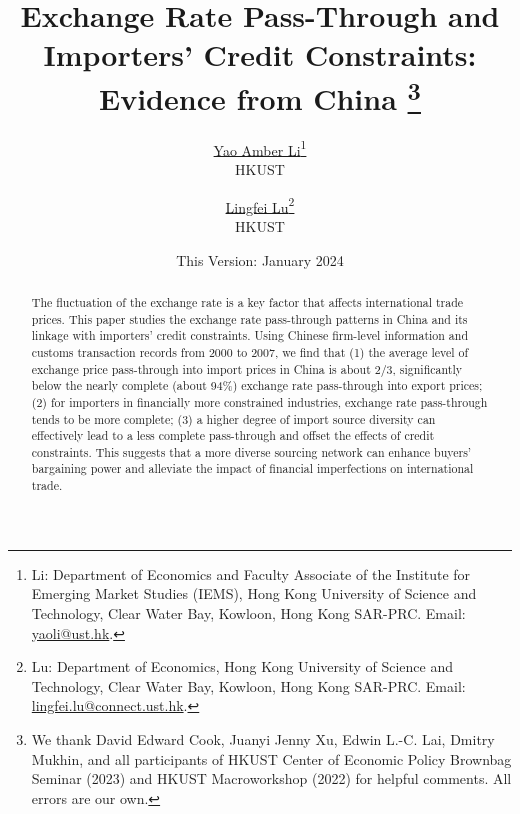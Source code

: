 

\linespread{1.2}
\geometry{a4paper,scale=0.75}



\title{  \Large \textbf{Exchange Rate Pass-Through and Importers' Credit Constraints: Evidence from China} 
\thanks{We thank David Edward Cook, Juanyi Jenny Xu, Edwin L.-C. Lai, Dmitry Mukhin, and all participants of HKUST Center of Economic Policy Brownbag Seminar (2023) and HKUST Macroworkshop (2022) for helpful comments. All errors are our own.}}

\author{\large \href{http://yaoli.people.ust.hk/}{Yao Amber Li}\thanks{Li: Department of Economics and Faculty Associate of the Institute for Emerging Market Studies (IEMS), Hong Kong University of Science and Technology, Clear Water Bay, Kowloon, Hong Kong SAR-PRC. Email: \href{mailto:yaoli@ust.hk}{yaoli@ust.hk}.}\\ \large{HKUST}
\and \large \href{}{Lingfei Lu}\thanks{Lu: Department of Economics, Hong Kong University of Science and Technology, Clear Water Bay, Kowloon, Hong Kong SAR-PRC. Email: \href{mailto:}{lingfei.lu@connect.ust.hk}.} \\ \large{HKUST}
 }

\date{This Version: January 2024}

\maketitle

\begin{abstract}
The fluctuation of the exchange rate is a key factor that affects international trade prices. This paper studies the exchange rate pass-through patterns in China and its linkage with importers' credit constraints. Using Chinese firm-level information and customs transaction records from 2000 to 2007, we find that (1) the average level of exchange price pass-through into import prices in China is about 2/3, significantly below the nearly complete (about 94\%) exchange rate pass-through into export prices; (2) for importers in financially more constrained industries, exchange rate pass-through tends to be more complete; (3) a higher degree of import source diversity can effectively lead to a less complete pass-through and offset the effects of credit constraints. This suggests that a more diverse sourcing network can enhance buyers' bargaining power and alleviate the impact of financial imperfections on international trade.

\end{abstract}


